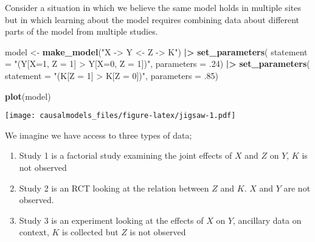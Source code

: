 \documentclass[
  12pt,
]{book}
\newenvironment{Shaded}{\begin{snugshade}}{\end{snugshade}}
\newcommand{\AttributeTok}[1]{\textcolor[rgb]{0.13,0.29,0.53}{#1}}
\newcommand{\DecValTok}[1]{\textcolor[rgb]{0.00,0.00,0.81}{#1}}
\newcommand{\FunctionTok}[1]{\textcolor[rgb]{0.13,0.29,0.53}{\textbf{#1}}}
\newcommand{\NormalTok}[1]{#1}
\newcommand{\OtherTok}[1]{\textcolor[rgb]{0.56,0.35,0.01}{#1}}
\newcommand{\SpecialCharTok}[1]{\textcolor[rgb]{0.81,0.36,0.00}{\textbf{#1}}}
\newcommand{\StringTok}[1]{\textcolor[rgb]{0.31,0.60,0.02}{#1}}
\providecommand{\tightlist}{%
  \setlength{\itemsep}{0pt}\setlength{\parskip}{0pt}}
\begin{document}
Consider a situation in which we believe the same model holds in multiple sites but in which learning about the model requires combining data about different parts of the model from multiple studies.

\begin{Shaded}
\begin{Highlighting}[]
\NormalTok{model }\OtherTok{\textless{}{-}} 
  \FunctionTok{make\_model}\NormalTok{(}\StringTok{"X {-}\textgreater{} Y \textless{}{-} Z {-}\textgreater{} K"}\NormalTok{) }\SpecialCharTok{|\textgreater{}}
  \FunctionTok{set\_parameters}\NormalTok{(}
    \AttributeTok{statement =} \StringTok{"(Y[X=1, Z = 1] \textgreater{} Y[X=0, Z = 1])"}\NormalTok{, }\AttributeTok{parameters =}\NormalTok{ .}\DecValTok{24}\NormalTok{) }\SpecialCharTok{|\textgreater{}}
  \FunctionTok{set\_parameters}\NormalTok{(}
    \AttributeTok{statement =} \StringTok{"(K[Z = 1] \textgreater{} K[Z = 0])"}\NormalTok{, }\AttributeTok{parameters =}\NormalTok{ .}\DecValTok{85}\NormalTok{)}


\FunctionTok{plot}\NormalTok{(model)}
\end{Highlighting}
\end{Shaded}

\texttt{[image: causalmodels\_files/figure-latex/jigsaw-1.pdf]}

We imagine we have access to three types of data;

\begin{enumerate}
\def\labelenumi{\arabic{enumi}.}
\tightlist
\item
  Study 1 is a factorial study examining the joint effects of \(X\) and \(Z\) on \(Y\), \(K\) is not observed
\item
  Study 2 is an RCT looking at the relation between \(Z\) and \(K\). \(X\) and \(Y\) are not observed.
\item
  Study 3 is an experiment looking at the effects of \(X\) on \(Y\), ancillary data on context, \(K\) is collected but \(Z\) is not observed
\end{enumerate}
\end{document}
